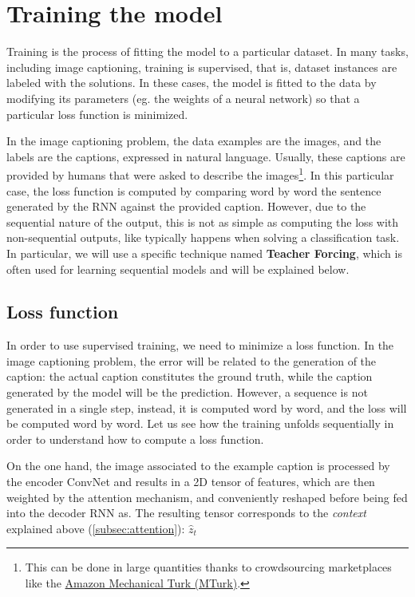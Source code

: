 \section{Training the model}\label{sec:training}

Training is the process of fitting the model to a particular dataset. In many tasks, including image captioning, training is supervised, that is, dataset instances are labeled with the solutions. In these cases, the model is fitted to the data by modifying its parameters (eg. the weights of a neural network) so that a particular loss function is minimized.

In the image captioning problem, the data examples are the images, and the labels are the captions, expressed in natural language. Usually, these captions are provided by humans that were asked to describe the images\footnote{This can be done in large quantities thanks to crowdsourcing marketplaces like the \href{https://www.mturk.com/}{ Amazon Mechanical Turk (MTurk)}.}. In this particular case, the loss function is computed by comparing word by word the sentence generated by the RNN against the provided caption. However, due to the sequential nature of the output, this is not as simple as computing the loss with non-sequential outputs, like typically happens when solving a classification task. In particular, we will use a specific technique named \textbf{Teacher Forcing}, which is often used for learning sequential models and will be explained below.

\subsection{Loss function}\label{subsec:loss_function}

In order to use supervised training, we need to minimize a loss function. In the image captioning problem, the error will be related to the generation of the caption: the actual caption constitutes the ground truth, while the caption generated by the model will be the prediction. However, a sequence is not generated in a single step, instead, it is computed word by word, and the loss will be computed word by word. Let us see how the training unfolds sequentially in order to understand how to compute a loss function.

On the one hand, the image associated to the example caption is processed by the encoder ConvNet and results in a 2D tensor of features, which are then weighted by the attention mechanism, and conveniently reshaped before being fed into the decoder RNN as. The resulting tensor corresponds to the \textit{context} explained above (\cref{subsec:attention}): $\hat{z}_t$


